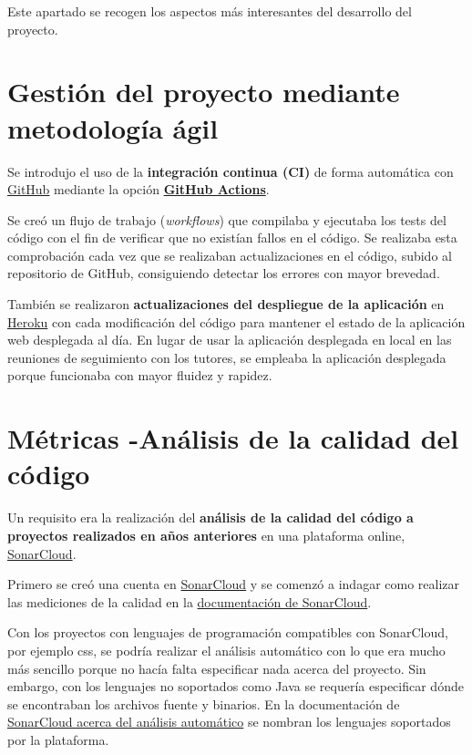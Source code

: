 
Este apartado se recogen los aspectos más interesantes del desarrollo del proyecto.

\section{Gestión del proyecto mediante metodología ágil}
Se introdujo el uso de la \textbf{integración continua (CI)} de forma automática con \href{https://github.com/dbo1001/Gestor-TFG-2021/blob/master/.github/workflows/github-ci.yml}{GitHub} mediante la opción \textbf{\href{https://github.com/dbo1001/Gestor-TFG-2021/actions}{GitHub Actions}}. 

Se creó un flujo de trabajo (\emph{workflows}) que compilaba y  ejecutaba los tests del código con el fin de verificar que no existían fallos en el código. Se realizaba esta comprobación cada vez que se realizaban actualizaciones en el código, subido al repositorio de GitHub, consiguiendo detectar los errores con mayor brevedad.

También se realizaron \textbf{actualizaciones del despliegue de la aplicación} en \href{https://gestor-tfg-2021.herokuapp.com/}{Heroku} con cada modificación del código para mantener el estado de la aplicación web desplegada al día. En lugar de usar la aplicación desplegada en local en las reuniones de seguimiento con los tutores, se empleaba la aplicación desplegada porque funcionaba con mayor fluidez y rapidez.

\section{Métricas -Análisis de la calidad del código}
Un requisito era la realización del \textbf{análisis de la calidad del código a proyectos realizados en años anteriores} en una plataforma online, \href{https://sonarcloud.io/organizations/dbo1001/projects/}{SonarCloud}. 

Primero se creó una cuenta en \href{https://sonarcloud.io}{SonarCloud} y se comenzó a indagar como realizar las mediciones de la calidad en la \href{https://sonarcloud.io/documentation}{documentación de SonarCloud}. 

Con los proyectos con lenguajes de programación compatibles con SonarCloud, por ejemplo css, se podría realizar el análisis automático con lo que era mucho más sencillo porque no hacía falta especificar nada acerca del proyecto. Sin embargo, con los lenguajes no soportados como Java se requería especificar dónde se encontraban los archivos fuente y binarios.
En la documentación de \href{https://sonarcloud.io/documentation/analysis/automatic-analysis/}{SonarCloud acerca del análisis automático} se nombran los lenguajes soportados por la plataforma.
 
